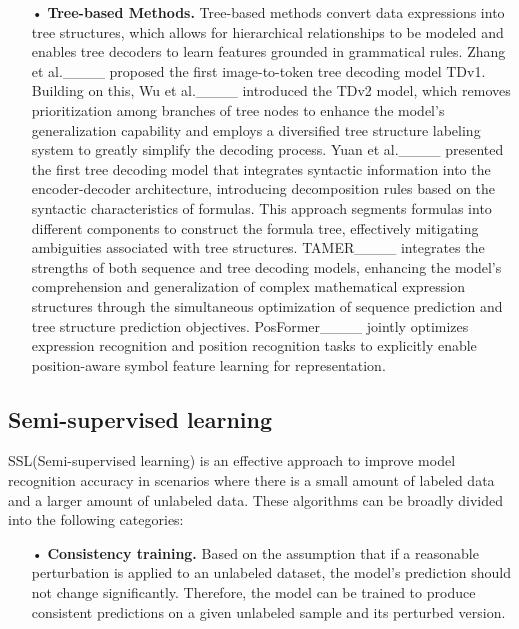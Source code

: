 \begin{itemize}
    \item [•] 
    \textbf{Tree-based Methods.}
    Tree-based methods convert data expressions into tree structures, which allows for hierarchical relationships to be modeled and enables tree decoders to learn features grounded in grammatical rules. Zhang et al.____ proposed the first image-to-token tree decoding model TDv1. Building on this, Wu et al.____ introduced the TDv2 model, which removes prioritization among branches of tree nodes to enhance the model’s generalization capability and employs a diversified tree structure labeling system to greatly simplify the decoding process. Yuan et al.____ presented the first tree decoding model that integrates syntactic information into the encoder-decoder architecture, introducing decomposition rules based on the syntactic characteristics of formulas. This approach segments formulas into different components to construct the formula tree, effectively mitigating ambiguities associated with tree structures. TAMER____ integrates the strengths of both sequence and tree decoding models, enhancing the model's comprehension and generalization of complex mathematical expression structures through the simultaneous optimization of sequence prediction and tree structure prediction objectives. PosFormer____ jointly optimizes expression recognition and position recognition tasks to explicitly enable position-aware symbol feature learning for representation.
\end{itemize}

\subsection{Semi-supervised learning} \label{sec2.2}
SSL(Semi-supervised learning) is an effective approach to improve model recognition accuracy in scenarios where there is a small amount of labeled data and a larger amount of unlabeled data. These algorithms can be broadly divided into the following categories:

\begin{itemize}
    \item [•] 
    \textbf{Consistency training.}
    Based on the assumption that if a reasonable perturbation is applied to an unlabeled dataset, the model's prediction should not change significantly. Therefore, the model can be trained to produce consistent predictions on a given unlabeled sample and its perturbed version.
\end{itemize}

